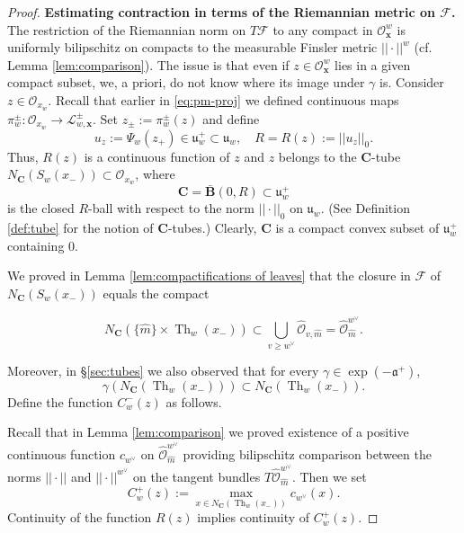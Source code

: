 \documentclass[10pt,a4paper]{amsart}
\def\CC{{\mathbf{C}}}
\DeclareMathOperator{\Th}{Th}
\def\bx{\mathbf{x}}
\def\cF{{\mathscr{F}}}
\def\cL{{\mathscr{L}}}
\def\cO{{\mathscr{O}}}
\def\ga{\gamma}
\begin{document}
\begin{proof}
\medskip 
{\bf Estimating contraction in terms of the Riemannian metric on $\cF$.}  
The restriction of 
the Riemannian norm on $T\cF$ to any compact in $\cO^w_{\bx}$  is uniformly bilipschitz on compacts to the measurable Finsler metric  
$||\cdot||^w$ (cf. Lemma \ref{lem:comparison}). The issue is that even if $z\in \cO^w_{\bx}$
 lies in a given compact subset, we, a priori, do not know where its image under $\ga$ is. Consider 
 $z\in \cO_{x_w}$. Recall that earlier in \eqref{eq:pm-proj} we defined continuous maps $\pi_{w}^{\pm}: \cO_{x_w}\to \cL^\pm_{w,\bx}$. 
 Set $z_\pm:= \pi_{w}^{\pm}(z)$  and define 
 $$
 u_z:= \Psi_w(z_+)\in \mathfrak{u}_w^+\subset 
 \mathfrak{u}_w, \quad R=R(z):= ||u_z||_0. 
 $$
 Thus, $R(z)$ is a continuous function of $z$ and $z$ belongs to the $\CC$-tube $N_{\CC}(S_{w}(x_-))\subset \cO_{x_w}$, where 
$$
\CC=\bar{\mathbf{B}}(0, R)\subset \mathfrak{u}^+_w
$$ 
is the closed $R$-ball with respect to the norm $||\cdot||_0$ on $ \mathfrak{u}_w$. 
(See Definition \ref{def:tube} for the notion of $\CC$-tubes.) 
Clearly, $\CC$ is a compact convex subset of $\mathfrak{u}^+_w$ containing $0$. 

We proved in Lemma \ref{lem:compactifications of leaves} 
that the closure in $\cF$ of $N_{\CC}(S_{w}(x_-))$ equals the compact 

{$$
N_{\CC}(\{\hat{m} \} \times \Th_{w}(x_-))\subset \bigcup_{v\geq w^\vee}\hat{\cO}_{v, \hat{m}}=\hat{\cO}_{\hat{m}}^{w^\vee}.$$}
 
Moreover, in \S \ref{sec:tubes} we also observed that 
for every $\gamma\in \exp(- \mathfrak{a}^+)$, 
$$
\ga(N_{\CC}(\Th_{w}(x_-)))\subset N_{\CC}(\Th_{w}(x_-)).$$
Define the function $C_w^-(z)$ as follows.


Recall that in Lemma \ref{lem:comparison} we proved existence of a positive continuous function $c_{w^\vee}$ 
on $\hat{\cO}^{w^\vee}_{\hat{m}}$ providing bilipschitz comparison between the norms $||\cdot||$ and $||\cdot||^{w^\vee}$ on the tangent bundles $T\hat{\cO}_{\hat{m}}^{w^\vee}$. 
Then we set
$$
C_w^+(z):=\max_{x\in N_{\CC}(\Th_{w}(x_-))} c_{w^\vee}(x). 
$$
Continuity of the function $R(z)$ implies continuity of $C_w^+(z)$.
 

\end{proof}
\end{document}
